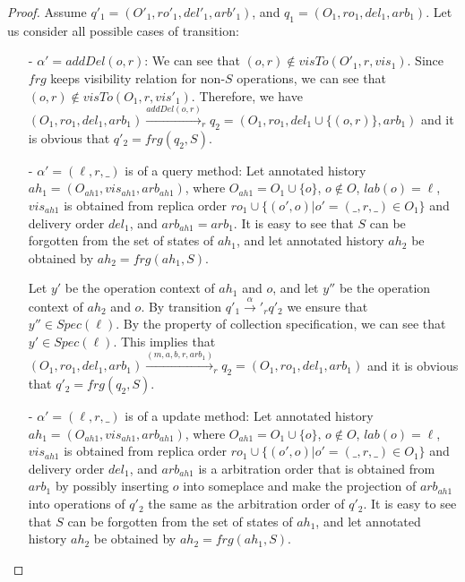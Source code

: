 \begin {proof}

Assume $q'_1 = (O'_1,\mathit{ro}'_1,\mathit{del}'_1,\mathit{arb}'_1)$, and $q_1 = (O_1,\mathit{ro}_1,\mathit{del}_1,\mathit{arb}_1)$. Let us consider all possible cases of transition:

\begin{itemize}
\setlength{\itemsep}{0.5pt}
\item[-] $\alpha' = \mathit{addDel}(o,r)$: We can see that $(o,r)\notin visTo(O'_1,r,\mathit{vis}_1)$. Since $\mathit{frg}$ keeps visibility relation for non-$S$ operations, we can see that $(o,r)\notin visTo(O_1,r,\mathit{vis}'_1)$. Therefore, we have $ (O_1,\mathit{ro}_1,\mathit{del}_1,\mathit{arb}_1) {\xrightarrow{addDel(o,r)}}_r q_2 = (O_1,\mathit{ro}_1,\mathit{del}_1 \cup \{ (o,r) \},\mathit{arb}_1)$ and it is obvious that $q'_2 = \mathit{frg}(q_2,S)$.

\item[-] $\alpha' = (\ell,r,\_)$ is of a query method: Let annotated history $\mathit{ah}_1 = (O_{\mathit{ah1}},\mathit{vis}_{\mathit{ah1}},\mathit{arb}_{\mathit{ah1}})$, where $O_{\mathit{ah1}} = O_1 \cup \{ o \}$, $o \notin O$, $\mathit{lab}(o)=\ell$, $\mathit{vis}_{\mathit{ah1}}$ is obtained from replica order $\mathit{ro}_1 \cup \{ (o',o) \vert o' = (\_,r,\_) \in O_1\}$ and delivery order $\mathit{del}_1$, and $\mathit{arb}_{\mathit{ah1}} = \mathit{arb}_1$. It is easy to see that $S$ can be forgotten from the set of states of $\mathit{ah}_1$, and let annotated history $\mathit{ah}_2$ be obtained by $\mathit{ah}_2 = \mathit{frg}(\mathit{ah}_1,S)$.

    Let $y'$ be the operation context of $\mathit{ah}_1$ and $o$, and let $y''$ be the operation context of $\mathit{ah}_2$ and $o$. By transition $q'_1 {\xrightarrow{\alpha}'}_r q'_2$ we ensure that $y'' \in \mathit{Spec}(\ell)$. By the property of collection specification, we can see that $y' \in \mathit{Spec}(\ell)$. This implies that $(O_1,\mathit{ro}_1,\mathit{del}_1,\mathit{arb}_1) {\xrightarrow{(m,a,b,r,\mathit{arb}_1)}}_r q_2 = (O_1,\mathit{ro}_1,\mathit{del}_1,\mathit{arb}_1)$ and it is obvious that $q'_2 = \mathit{frg}(q_2,S)$.

\item[-] $\alpha' = (\ell,r,\_)$ is of a update method: Let annotated history $\mathit{ah}_1 = (O_{\mathit{ah1}},\mathit{vis}_{\mathit{ah1}},\mathit{arb}_{\mathit{ah1}})$, where $O_{\mathit{ah1}} = O_1 \cup \{ o \}$, $o \notin O$, $\mathit{lab}(o)=\ell$, $\mathit{vis}_{\mathit{ah1}}$ is obtained from replica order $\mathit{ro}_1 \cup \{ (o',o) \vert o' = (\_,r,\_) \in O_1\}$ and delivery order $\mathit{del}_1$, and $\mathit{arb}_{\mathit{ah1}}$ is a arbitration order that is obtained from $\mathit{arb}_1$ by possibly inserting $o$ into someplace and make the projection of $\mathit{arb}_{\mathit{ah1}}$ into operations of $q'_2$ the same as the arbitration order of $q'_2$. It is easy to see that $S$ can be forgotten from the set of states of $\mathit{ah}_1$, and let annotated history $\mathit{ah}_2$ be obtained by $\mathit{ah}_2 = \mathit{frg}(\mathit{ah}_1,S)$.


\end{itemize}
\end{proof}
